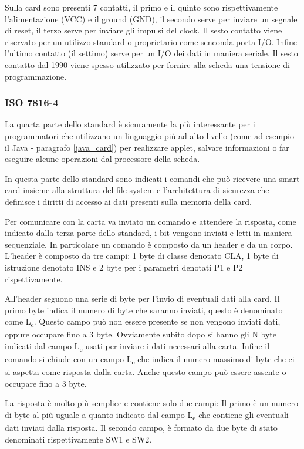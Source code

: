 Sulla card sono presenti 7 contatti, il primo e il quinto sono rispettivamente l'alimentazione (VCC) e il ground (GND), il secondo serve per inviare un segnale di reset, il terzo serve per inviare gli impulsi del clock. Il sesto contatto viene riservato per un utilizzo standard o proprietario come senconda porta I/O. Infine l'ultimo contatto (il settimo) serve per un I/O dei dati in maniera seriale. Il sesto contatto dal 1990 viene spesso utilizzato per fornire alla scheda una tensione di programmazione.
\cite{isoiec3}

\subsubsection{ISO 7816-4}
La quarta parte dello standard è sicuramente la più interessante per i programmatori che utilizzano un linguaggio più ad alto livello (come ad esempio il Java - paragrafo \ref{java_card}) per realizzare applet, salvare informazioni o far eseguire alcune operazioni dal processore della scheda.

In questa parte dello standard sono indicati i comandi che può ricevere una smart card insieme alla struttura del file system e l'architettura di sicurezza che definisce i diritti di accesso ai dati presenti sulla memoria della card.

Per comunicare con la carta va inviato un comando e attendere la risposta, come indicato dalla terza parte dello standard, i bit vengono inviati e letti in maniera sequenziale. In particolare un comando è composto da un header e da un corpo. L'header è composto da tre campi: 1 byte di classe denotato CLA, 1 byte di istruzione denotato INS e 2 byte per i parametri denotati P1 e P2 rispettivamente.

All'header seguono una serie di byte per l'invio di eventuali dati alla card. Il primo byte indica il numero di byte che saranno inviati, questo è denominato come L\textsubscript{c}. Questo campo può non essere presente se non vengono inviati dati, oppure occupare fino a 3 byte. Ovviamente subito dopo si hanno gli N byte indicati dal campo L\textsubscript{c} usati per inviare i dati necessari alla carta. Infine il comando si chiude con un campo L\textsubscript{e} che indica il numero massimo di byte che ci si aspetta come risposta dalla carta. Anche questo campo può essere assente o occupare fino a 3 byte.

La risposta è molto più semplice e contiene solo due campi: Il primo è un numero di byte al più uguale a quanto indicato dal campo L\textsubscript{e} che contiene gli eventuali dati inviati dalla risposta. Il secondo campo, è formato da due byte di stato denominati rispettivamente SW1 e SW2.
\cite{isoiec3}



